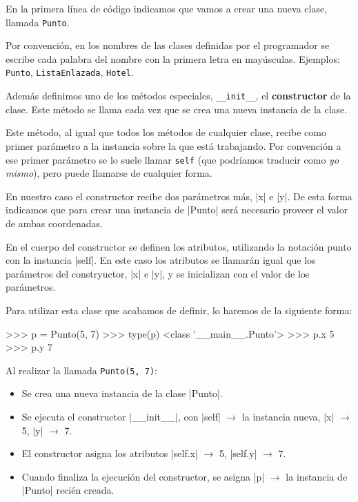 En la primera línea de código indicamos que vamos a crear una nueva clase,
llamada \lstinline!Punto!.

\begin{observacion}
Por convención, en los nombres de las clases definidas por el programador se
escribe cada palabra del nombre con la primera letra en mayúsculas.  Ejemplos:
\lstinline!Punto!, \lstinline!ListaEnlazada!, \lstinline!Hotel!.
\end{observacion}

Además definimos uno de los métodos especiales, \lstinline!__init__!, el
{\bf constructor} de la clase.  Este método se llama cada vez que se crea
una nueva instancia de la clase.

Este método, al igual que todos los métodos de cualquier clase, recibe como
primer parámetro a la instancia sobre la que está trabajando.  Por
convención a ese primer parámetro se lo suele llamar \lstinline!self! (que
podríamos traducir como {\it yo mismo}), pero puede llamarse de cualquier
forma.

En nuestro caso el constructor recibe dos parámetros más, |x| e |y|. De esta
forma indicamos que para crear una instancia de |Punto| será necesario proveer
el valor de ambas coordenadas.

En el cuerpo del constructor se definen los atributos, utilizando la notación
punto con la instancia |self|. En este caso los atributos se llamarán igual que
los parámetros del constryuctor, |x| e |y|, y se inicializan con el valor de
los parámetros.

Para utilizar esta clase que acabamos de definir, lo haremos de la
siguiente forma:

\begin{codigo-python-sn}
>>> p = Punto(5, 7)
>>> type(p)
<class '__main__.Punto'>
>>> p.x
5
>>> p.y
7
\end{codigo-python-sn}

Al realizar la llamada \lstinline!Punto(5, 7)!:

\begin{itemize}
\item Se crea una nueva instancia de la clase |Punto|.
\item Se ejecuta el constructor |__init__|, con |self| $\rightarrow$ la
    instancia nueva, |x| $\rightarrow$ 5, |y| $\rightarrow$ 7.
\item El constructor asigna los atributos |self.x| $\rightarrow$ 5, |self.y|
    $\rightarrow$ 7.
\item Cuando finaliza la ejecución del constructor, se asigna |p| $\rightarrow$
    la instancia de |Punto| recién creada.
\end{itemize}

